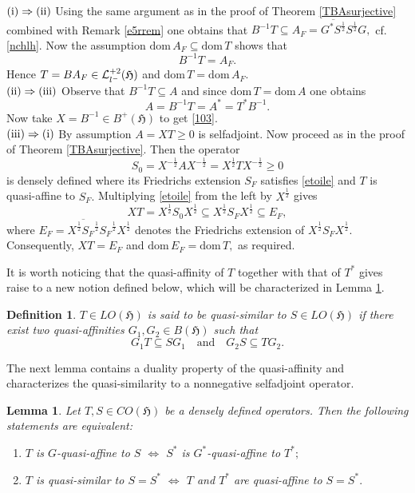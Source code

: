 \documentclass{amsart}
\makeatletter
\newtheorem{lemma}[theorem]{Lemma}
\newtheorem{definition}[theorem]{Definition}
\newcommand{\ifaf}{\Leftrightarrow}
\newcommand{\h}{\mathfrak{H}}
\newcommand{\D}{\mathrm{dom}\,}
\newcommand{\DT}{\mathrm{dom}\,T }
\newcommand{\DA}{\mathrm{dom}  \,A }
\newcommand{\adj}{^*}
\newcommand{\inv}{^{-1}}
\newcommand{\tstar}{T^{*}}
\newcommand{\half}{^{\frac{1}{2}}}
\newcommand{\mhalf}{^{-\frac{1}{2}}}
\newcommand{\inclu}{\subseteq}
\newcommand{\lplus}{B^{+}(\h)}
\newcommand{\lldeux}{\mathcal{L}_{{l}^{\tiny-}}^{+2}(\h)}
\numberwithin{equation}{section}
\renewenvironment{proof}[1][\proofname]{%
   \par\pushQED{\qed}\normalfont%
   \topsep6\p@\@plus6\p@\relax
   \trivlist\item[\hskip\labelsep\bfseries#1\@addpunct{.}]%
   \ignorespaces
}{%
   \popQED\endtrivlist\@endpefalse
}
\makeatother
\begin{document}
 \begin{proof}
   $\rm (i) \Rightarrow (ii)$
 Using the same argument as in the proof of Theorem  \ref{TBAsurjective} combined with  Remark \ref{e5rrem} one obtains  that  $B\inv T \inclu A_F= \overline{ G\adj S\half } S\half G,$ cf. \eqref{nchlh}. Now the assumption      $\D A_F \inclu \DT $ shows that
 $$
   B\inv T  = A_F.
   $$
   Hence $T = B A _F \in \lldeux$ and $\D T = \D A_F.$\\
 $\rm (ii) \Rightarrow (iii)$ Observe that $ B\inv T \inclu A $ and since $\DT = \DA$ one obtains
 $$ A = B\inv T = A\adj = \tstar B\inv.
 $$
 Now take $X= B\inv \in \lplus $ to get  \eqref{103}. \\
 $\rm (iii) \Rightarrow (i)$ By assumption $A=XT \geq 0$ is selfadjoint. 
 Now proceed as in the proof of Theorem \ref{TBAsurjective}. Then the operator
 \begin{equation}\label{hospoto}
   S_0= X\mhalf  A X\mhalf = X\half T X\mhalf \geq 0
 \end{equation}
is densely defined where its Friedrichs extension $S_F$ satisfies \eqref{etoile} and $T$ is quasi-affine to $S_F.$ Multiplying \eqref{etoile} from the left by $X\half$ gives
%
   $$
   X T  = X\half S_0  X\half \inclu X\half S_F  X\half \inclu  E_F,
   $$
   where $ E_F= \overline{X\half {S_F}\half} {S_F}\half X\half $ denotes the Friedrichs extension of $X\half S_F X\half.$ Consequently, $XT = E_F$ and  $\D E_F = \DT,$ as required.
 \end{proof}

It is worth noticing that the quasi-affinity of $T$ together with that of $\tstar$ gives raise to a new notion defined below, which will be characterized in Lemma \ref{equivquasisimilarity}.

 \begin{definition} \normalfont \cite[Definition 2.1]{Ota89}
  $T \in LO(\h)$ is said to be
  \emph{quasi-similar}    to $S \in LO(\h)$ if there
   exist two quasi-affinities $G_1 , G_2 \in B(\h)$ such that
$$
G_1T \inclu SG_1 \quad \text{and} \quad G_2S \inclu TG_2.
$$
\end{definition}

The next lemma contains a duality property of the quasi-affinity and characterizes the quasi-similarity to a nonnegative selfadjoint operator.

\begin{lemma}\label{equivquasisimilarity}
Let $T,S  \in CO(\h)$ be a densely defined operators.   Then the following statements are
equivalent:
\begin{enumerate}[\rm(i)]
 \item  $T$ is $G$-quasi-affine to $S$ $\ifaf$ $S\adj$ is $G\adj$-quasi-affine to $\tstar;$
  \item  $T$ is quasi-similar to   $S=S\adj $ $\ifaf$ $T$ and $\tstar$ are quasi-affine       to $S=S\adj.$
\end{enumerate}
\end{lemma}
\end{document}

